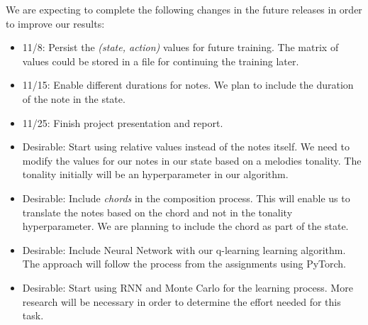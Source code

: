 We are expecting to complete the following changes in the future releases in order to improve our results:

\begin{itemize}
  \item 11/8: Persist the \emph{(state, action)} values for future training. The matrix of values could be stored in a file for continuing the training later.
  \item 11/15: Enable different durations for notes. We plan to include the duration of the note in the state.
  \item 11/25: Finish project presentation and report.
  \item Desirable: Start using relative values instead of the notes itself. We need to modify the values for our notes in our state based on a melodies tonality. The tonality initially will be an hyperparameter in our algorithm.
  \item Desirable: Include \emph{chords} in the composition process. This will enable us to translate the notes based on the chord and not in the tonality hyperparameter. We are planning to include the chord as part of the state.
  \item Desirable: Include Neural Network with our q-learning learning algorithm. The approach will follow the process from the assignments using PyTorch.
  \item Desirable: Start using RNN and Monte Carlo for the learning process. More research will be necessary in order to determine the effort needed for this task.
\end{itemize}